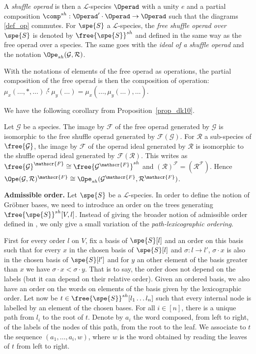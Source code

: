A {\em shuffle operad} is then a $\mathscr{L}$-species $\Operad$ with a unity $e$ and a partial composition $\comp^{sh}:\Operad'\cdot\Operad\to\Operad$ 
such that the diagrams \eqref{def_op} commutes. 
For $\spe{S}$ a $\mathscr{L}$-species, the {\em free shuffle operad over $\spe{S}$} is denoted by $\free{\spe{S}}^{sh}$ and defined in the same way as the free
operad over a species. The same goes with the {\em ideal of a shuffle operad} and the notation $\Ope_{sh}(\mathcal{G},\mathcal{R})$.

\begin{rema}
    With the notations of elements of the free operad as operations, the partial composition of the free operad is then the composition of operation:
    $\mu_x(\dots, \ast,\dots)\comp^\xi \mu_y(\dots)= \mu_x(\dots,\mu_y(\dots),\dots)$.
\end{rema}

We have the following corollary from Proposition~\ref{prop_dk10}.
\begin{theorem}[{\cite[Corollary 1]{DK10}}]
    Let $\mathcal{G}$ be a species. The image by $\mathscr{F}$ of the free operad generated by $\mathcal{G}$ is isomorphic to the free shuffle operad generated
    by $\mathscr{F}(\mathcal{G})$. For $\mathcal{R}$ a sub-species of $\free{\mathcal{G}}$, the image by $\mathscr{F}$ of the operad ideal generated by $\mathcal{R}$ is 
    isomorphic to the shuffle operad ideal generated  by $\mathscr{F}(\mathcal{R})$.
    This writes as $\free{\mathcal{G}}^{\mathscr{F}} \cong \free{\mathcal{G}^{\mathscr{F}}}^{sh}$ and $(\mathcal{R})^{\mathscr{F}}=(\mathcal{R}^{\mathscr{F}})$. 
    Hence $\Ope(\mathcal{G},\mathcal{R})^{\mathscr{F}}\cong\Ope_{sh}(\mathcal{G}^{\mathscr{F}},\mathcal{R}^{\mathscr{F}})$.
\end{theorem}

\noindent\textbf{Admissible order.} Let $\spe{S}$ be a $\mathscr{L}$-species. In order to define the notion of Gröbner bases, we need to introduce an order on the trees generating $\free{\spe{S}}^{sh}[V,l]$.
Instead of giving the broader notion of admissible order defined in \cite{DK10}, we only give a small variation of the {\em path-lexicographic ordering}.

First for every order $l$ on $V$, fix a basis of $\spe{S}[l]$ and an order on this basis such that for every $x$ in the chosen basis of $\spe{S}[l]$ and $\sigma:l\to l'$,  $\sigma\cdot x$ is also in the chosen basis of $\spe{S}[l']$ and for $y$ an other element of the basis greater than $x$ we have 
$\sigma\cdot x<\sigma\cdot y$.
That is to say, the order does not depend on the labels (but it can depend on their relative order). Given an ordered basis, we also have an order on the words on elements of the basis given by the lexicographic order.
Let now be $t\in\free{\spe{S}}^{sh}[l_1\dots l_n]$ such that every internal node is labelled by an element of the chosen bases. For all $i\in[n]$, there is a unique path from $l_i$ to the root of $t$. Denote by $a_i$ the word composed, from left
to right, of the labels of the nodes of this path, from the root to the leaf. We associate to $t$ the sequence $(a_1,\dots, a_i, w)$, where $w$ is the
word obtained by reading the leaves of $t$ from left to right. 

